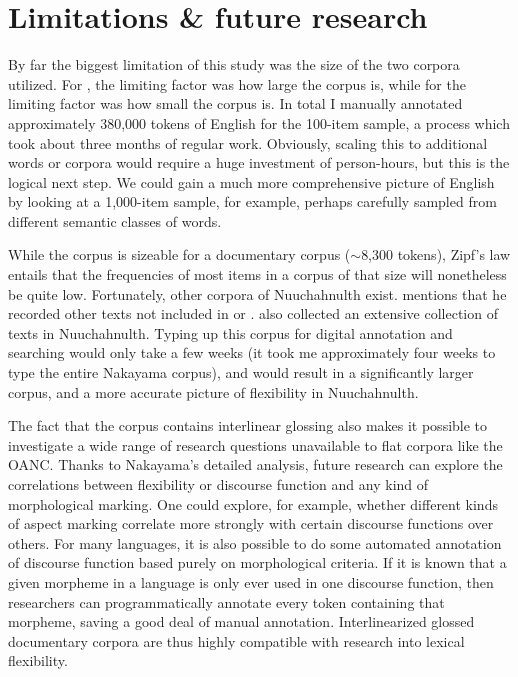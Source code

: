 \section{Limitations \& future research}
\label{sec:5.4}

By far the biggest limitation of this study was the size of the two corpora utilized. For , the limiting factor was how large the corpus is, while for  the limiting factor was how small the corpus is. In total I manually annotated approximately 380,000 tokens of English for the 100-item sample, a process which took about three months of regular work. Obviously, scaling this to additional words or corpora would require a huge investment of person-hours, but this is the logical next step. We could gain a much more comprehensive picture of English by looking at a 1,000-item sample, for example, perhaps carefully sampled from different semantic classes of words.

While the  corpus is sizeable for a documentary corpus ($\sim$8,300 tokens), Zipf's law entails that the frequencies of most items in a corpus of that size will nonetheless be quite low. Fortunately, other corpora of Nuuchahnulth exist. \textcite{Nakayama2001} mentions that he recorded other texts not included in \textcite{Little2003} or \textcite{Louie2003}. \textcite{SapirSwadesh1939} also collected an extensive collection of texts in Nuuchahnulth. Typing up this corpus for digital annotation and searching would only take a few weeks (it took me approximately four weeks to type the entire Nakayama corpus), and would result in a significantly larger corpus, and a more accurate picture of flexibility in Nuuchahnulth.

The fact that the  corpus contains interlinear glossing also makes it possible to investigate a wide range of research questions unavailable to flat corpora like the OANC. Thanks to Nakayama's detailed analysis, future research can explore the correlations between flexibility or discourse function and any kind of morphological marking. One could explore, for example, whether different kinds of aspect marking correlate more strongly with certain discourse functions over others. For many languages, it is also possible to do some automated annotation of discourse function based purely on morphological criteria. If it is known that a given morpheme in a language is only ever used in one discourse function, then researchers can programmatically annotate every token containing that morpheme, saving a good deal of manual annotation. Interlinearized glossed documentary corpora are thus highly compatible with research into lexical flexibility.

